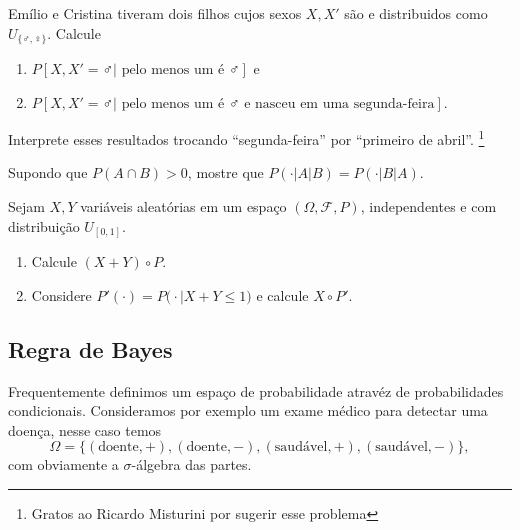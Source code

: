 \begin{exercise}
  Emílio e Cristina tiveram dois filhos cujos sexos $X, X'$ são \iid e distribuidos como $U_{\{\male, \female\}}$.
  Calcule
  \begin{enumerate}[\quad a)]
  \item $P[X, X' = \male | \text{ pelo menos um é $\male$}]$ e
  \item $P[X, X' = \male | \text{ pelo menos um é $\male$ e nasceu em uma segunda-feira}]$.
  \end{enumerate}
  Interprete esses resultados trocando ``segunda-feira'' por ``primeiro de abril''.
  \footnote{Gratos ao Ricardo Misturini por sugerir esse problema}
\end{exercise}

\begin{exercise}
  Supondo que $P(A \cap B) > 0$, mostre que $P(\cdot|A|B) = P(\cdot|B|A)$.
\end{exercise}

\begin{exercise}
  Sejam $X, Y$ vari\'aveis aleat\'orias em um espaço $(\Omega, \mathcal{F}, P)$, independentes e com distribuição $U_{[0,1]}$.
  \begin{enumerate}[\quad a)]
  \item Calcule $(X+Y) \circ P$.
  \item Considere $P'(\cdot) = P\big(\cdot | X + Y \leq 1 \big)$ e calcule $X \circ P'$.
  \end{enumerate}
\end{exercise}


\subsection{Regra de Bayes}

Frequentemente definimos um espaço de probabilidade atravéz de probabilidades condicionais.
Consideramos por exemplo um exame médico para detectar uma doença, nesse caso temos
\begin{equation}
  \Omega = \{(\text{doente}, +), (\text{doente}, -), (\text{saudável}, +), (\text{saudável}, -)\},
\end{equation}
com obviamente a $\sigma$-álgebra das partes.

